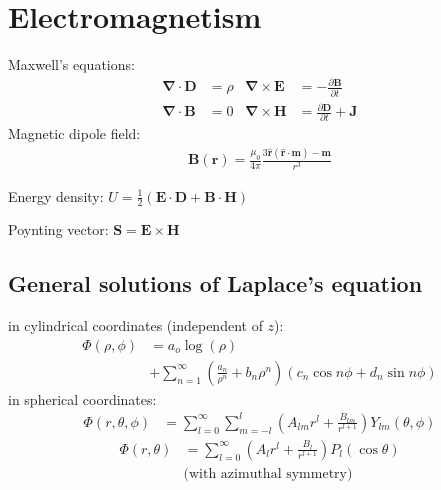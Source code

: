 \documentclass[10pt,twocolumn]{article}
\newcommand{\sigaussian}[2]{#1} %
\newcommand{\muooverfourpi}{\sigaussian{\frac{\mu_0}{4\pi}}{}}
\newcommand{\D}{\mathbf{\nabla}}
\newcommand{\B}{\mathbf{B}}
\newcommand{\E}{\mathbf{E}}
\newcommand{\m}{\mathbf{m}}
\newcommand{\rr}{\mathbf{r}}
\newcommand{\rhat}{\mathbf{\hat{r}}}
\begin{document}
  \section{Electromagnetism}
  Maxwell's equations:
  \begin{align*}
    \D\cdot\mathbf{D} &= \sigaussian{}{4\pi}\rho &
    \D\times\E &= -\sigaussian{}{\frac1c}\frac{\partial\B}{\partial t} \\
    \D\cdot\B &= 0
    & \D\times\mathbf{H} &=
    \sigaussian{}{\frac1c}\frac{\partial \mathbf{D}}{\partial t}
    + \sigaussian{}{\frac{4\pi}c}\mathbf{J}
  \end{align*}
  Magnetic dipole field:
  \begin{align*}
  \B(\rr) = \muooverfourpi\frac{3\rhat(\rhat\cdot\m)-\m}{r^3}
  \end{align*}

  \noindent Energy density:
  $ U = \frac{1}{\sigaussian{2}{8\pi}}(\E\cdot\mathbf{D} +
  \B\cdot\mathbf{H})$

  \noindent Poynting vector:
  $ \mathbf{S} = \sigaussian{}{\frac{c}{4\pi}} \E\times\mathbf{H}$

  \subsection*{General solutions of Laplace's equation}
  in cylindrical coordinates (independent of $z$):
  \begin{align*}
    \Phi(\rho,\phi) &= a_o\log(\rho) \\
      & +\sum_{n=1}^\infty\left( \frac{a_n}{\rho^n} + b_n\rho^n
      \right)\left( c_n\cos n\phi + d_n\sin n\phi \right)
  \end{align*}
  in spherical coordinates:
  \begin{align*}
    \Phi(r,\theta,\phi) &= \sum_{l=0}^\infty\sum_{m=-l}^l\left(
      A_{lm}r^l + \frac{B_{lm}}{r^{l+1}} \right) Y_{lm}(\theta,\phi)
  \end{align*}
  \begin{align*}
    \Phi(r,\theta) &= \sum_{l=0}^\infty\left(
      A_lr^l + \frac{B_l}{r^{l+1}} \right) P_l(\cos\theta) \\
      &\text{(with azimuthal symmetry)}
  \end{align*}
\end{document}
